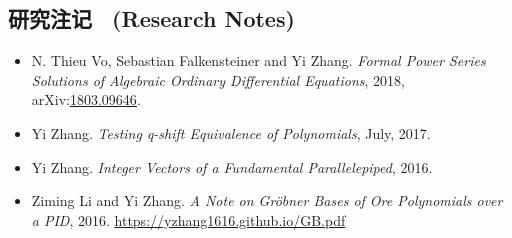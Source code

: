 \documentclass[a4paper,12pt]{article}
\newcommand{\red}{\color{red}}
\begin{document}
\begin{CJK*}{UTF8}{gbsn}
% 

\section*{\Large{研究注记 \ (Research Notes)}}
\begin{itemize}
  \item N. Thieu Vo, Sebastian Falkensteiner and Yi Zhang.
 {\em Formal Power Series Solutions of Algebraic Ordinary Differential Equations}, 
 2018, arXiv:\href{https://arxiv.org/abs/1803.09646}{1803.09646}.
 \item Yi Zhang. {\em Testing q-shift Equivalence of Polynomials}, July, 2017.
 \item Yi Zhang. {\em Integer Vectors of a Fundamental Parallelepiped}, 2016.
 \item Ziming Li and Yi Zhang. {\em A Note on Gr\"{o}bner Bases of Ore Polynomials over a PID}, 2016. 
 \url{https://yzhang1616.github.io/GB.pdf} 
\end{itemize}


\end{CJK*}
\end{document}
